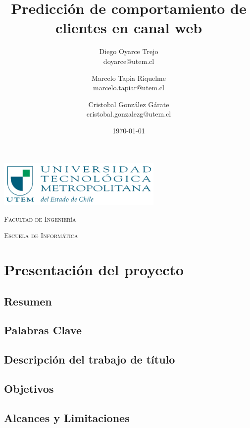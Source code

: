 \documentclass{report}
\title{\Huge Predicción de comportamiento de clientes en canal web}
\author{Diego Oyarce Trejo \\ doyarce@utem.cl \and
        Marcelo Tapia Riquelme \\ marcelo.tapiar@utem.cl \and
        Cristobal González Gárate \\ cristobal.gonzalezg@utem.cl
        }
\date{\today}
\begin{document}
\begin{titlepage}
  \centering  
  \includegraphics[width=0.6\textwidth]{img/logoutem.png}  
  \vspace{1cm}
  
  \textsc{\normalsize Facultad de Ingeniería}  
  \vspace{0.5cm}
  
  \textsc{\normalsize Escuela de Informática}
  {\let\newpage\relax\maketitle}
\end{titlepage}

\tableofcontents

\listoffigures

\setcounter{section}{1}

\chapter{Presentación del proyecto}

\section{Resumen}


\section{Palabras Clave}


\section{Descripción del trabajo de título}


\section{Objetivos}


\section{Alcances y Limitaciones}

\end{document}
